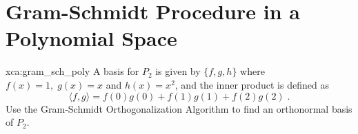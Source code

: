 \section{Gram-Schmidt Procedure in a Polynomial Space}

\begin{xca}{xca:gram_sch_poly}
A basis for $P_2$ is given by $\{f,g,h\}$ where $f(x)=1,\; g(x)=x$ and $h(x)=x^2$, and the inner product is defined as $$\langle f, g \rangle = f(0)g(0) + f(1)g(1) + f(2)g(2)\;.$$ Use the Gram-Schmidt Orthogonalization Algorithm to find an orthonormal basis of $P_2.$
\end{xca}

